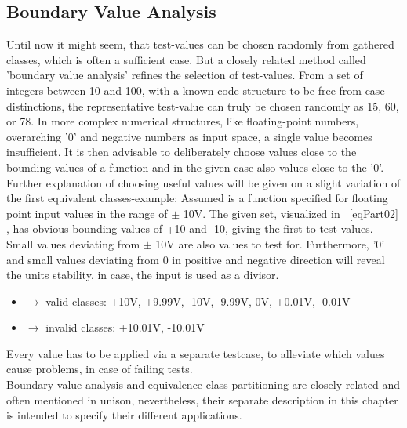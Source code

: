 	\subsection{Boundary Value Analysis} %
	Until now it might seem, that test-values can be chosen randomly from gathered classes, which is often a sufficient case. But a closely related method called 'boundary value analysis' refines the selection of test-values. From a set of integers between 10 and 100, with a known code structure to be free from case distinctions, the representative test-value can truly be chosen randomly as 15, 60, or 78. In more complex numerical structures, like floating-point numbers, overarching '0' and negative numbers as input space, a single value becomes insufficient. It is then advisable to deliberately choose values close to the bounding values of a function and in the given case also values close to the '0'.
	Further explanation of choosing useful values will be given on a slight variation of the first equivalent classes-example: Assumed is a function specified for floating point input values in the range of $\pm$ 10V. 
	The given set, visualized in ~\ref{eqPart02}  , has obvious bounding values of +10 and -10, giving the first to test-values. Small values deviating from $\pm$ 10V are also values to test for. Furthermore, '0' and small values deviating from 0 in positive and negative direction will reveal the units stability, in case, the input is used as a divisor. \\
	\begin{itemize}[label={}]
		\item	$\rightarrow$ valid classes: +10V, +9.99V, -10V, -9.99V, 0V, +0.01V, -0.01V \\
		\item	$\rightarrow$ invalid classes: +10.01V, -10.01V \\
	\end{itemize}
	Every value has to be applied via a separate testcase, to alleviate which values cause problems, in case of failing tests. \\
	Boundary value analysis and equivalence class partitioning are closely related and often mentioned in unison, nevertheless, their separate description in this chapter is intended to specify their different applications.
		

